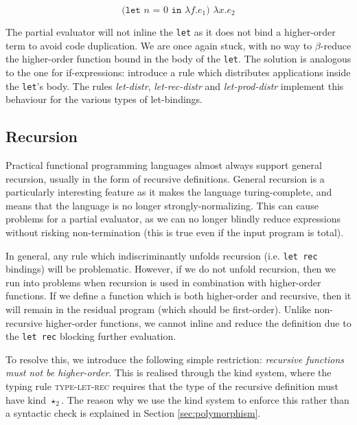 \documentclass[runningheads]{llncs}
\begin{document}
\begin{equation*}
  \texttt{(let $n$ = $0$ in $\lambda f. e_1$) $\lambda x. e_2$}
\end{equation*}

The partial evaluator will not inline the \texttt{let} as it does not bind a higher-order term to avoid code duplication. We are once again stuck, with no way to $\beta$-reduce the higher-order function bound in the body of the \texttt{let}. The solution is analogous to the one for if-expressions: introduce a rule which distributes applications inside the \texttt{let}'s body. The rules \textit{\scriptsize let-distr}, \textit{\scriptsize let-rec-distr} and \textit{\scriptsize let-prod-distr} implement this behaviour for the various types of let-bindings.


\subsection{Recursion} \label{sec:recursion}

Practical functional programming languages almost always support general recursion, usually in the form of recursive definitions. General recursion is a particularly interesting feature as it makes the language turing-complete, and means that the language is no longer strongly-normalizing. This can cause problems for a partial evaluator, as we can no longer blindly reduce expressions without risking non-termination (this is true even if the input program is total).

In general, any rule which indiscriminantly unfolds recursion (i.e. \texttt{let rec} bindings) will be problematic. However, if we do not unfold recursion, then we run into problems when recursion is used in combination with higher-order functions. If we define a function which is both higher-order and recursive, then it will remain in the residual program (which should be first-order). Unlike non-recursive higher-order functions, we cannot inline and reduce the definition due to the \texttt{let rec} blocking further evaluation.

To resolve this, we introduce the following simple restriction: \emph{recursive functions must not be higher-order}. This is realised through the kind system, where the typing rule \textsc{type-let-rec} requires that the type of the recursive definition must have kind $\star_2$. The reason why we use the kind system to enforce this rather than a syntactic check is explained in Section \ref{sec:polymorphism}.
\end{document}
